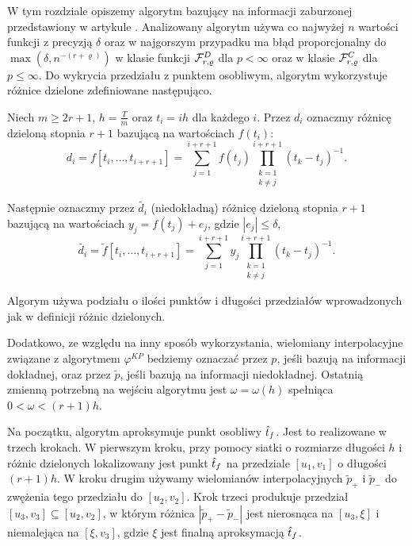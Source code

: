 \documentclass[oik, pdftex, robocza, man]{mgrwms}
\begin{document}
    W tym rozdziale opiszemy algorytm bazujący na informacji zaburzonej przedstawiony w artykule \cite{AoP}. Analizowany algorytm używa co najwyżej $n$ wartości funkcji z precyzją $\delta $ oraz w najgorszym przypadku ma błąd proporcjonalny do $\max{(\delta, n^{-(r + \varrho) })}$ w klasie funkcji $\mathcal{F}^D_{r,\varrho }$ dla $p < \infty$ oraz w klasie $\mathcal{F}^C_{r,\varrho }$ dla $p \leq \infty$. Do wykrycia przedziału z punktem osobliwym, algorytm wykorzystuje różnice dzielone zdefiniowane następująco.
    
    Niech $m \geq 2r + 1$, $h = \frac{T}{m}$ oraz $t_{i} = ih$ dla każdego $i$. Przez $d_{i}$ oznaczmy różnicę dzieloną stopnia $r+1$ bazującą na wartościach $f(t_{i})$:
    \begin{equation} \label{eq:30:roznica_dzielna}
        d_{i} = f[t_{i}, \dots, t_{i+r+1}] = \sum_{j = 1}^{i+r+1} f(t_{j}) \prod_{\substack{k=1 \\ k \neq j}}^{i+r+1}(t_{k}-t_{j})^{-1}.
    \end{equation}

    Następnie oznaczmy przez $\tilde{d_i}$ (niedokładną) różnicę dzieloną stopnia $r+1$ bazującą na wartościach $y_{j} = f(t_{j}) + e_{j}$, gdzie $|e_{j}| \leq \delta$,
    \begin{equation} \label{eq:31:niedokladna_roznica_dzielna}
        \tilde{d_{i}} = \tilde{f}[t_{i}, \dots, t_{i+r+1}] = \sum_{j = 1}^{i+r+1} y_{j} \prod_{\substack{k=1 \\ k \neq j}}^{i+r+1}(t_{k}-t_{j})^{-1}.
    \end{equation}

    Algorym używa podziału o ilości punktów i długości przedziałów wprowadzonych jak w definicji różnic dzielonych. 
    
    Dodatkowo, ze względu na inny sposób wykorzystania, wielomiany interpolacyjne związane z algorytmem $\varphi^{KP}$ bedziemy oznaczać przez $p$, jeśli bazują na informacji dokładnej, oraz przez $\tilde{p}$, jeśli bazują na informacji niedokładnej. Ostatnią zmienną potrzebną na wejściu algorytmu jest $\omega  = \omega(h)$ spełniąca $0 < \omega < (r + 1)h $.
    
    Na początku, algorytm aproksymuje punkt osobliwy $\hat{t}_f$. Jest to realizowane w trzech krokach. W pierwszym kroku, przy pomocy siatki o rozmiarze długości $h$ i różnic dzielonych lokalizowany jest punkt $\hat{t}_f$ na przedziale $[u_1, v_1]$ o długości $(r + 1)h$. W kroku drugim używamy wielomianów interpolacyjnych $\tilde{p}_+$ i $\tilde{p}_-$ do zwężenia tego przedziału do $[u_2, v_2]$. Krok trzeci produkuje przedział $[u_3, v_3] \subseteq [u_2, v_2]$, w którym różnica $|\tilde{p}_{+} - \tilde{p}_{-}|$ jest nierosnąca na $[u_3, \xi]$ i niemalejąca na $[\xi, v_3]$, gdzie $\xi$ jest finalną aproksymacją $\hat{t}_f$.
\end{document}
